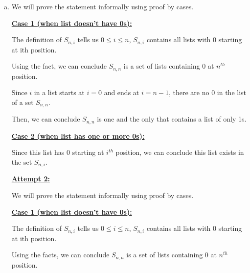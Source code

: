 \documentclass[12pt]{article}
\begin{document}
\begin{enumerate}[a.]
\begin{mdframed}
    \end{mdframed}

    \item

    We will prove the statement informally using proof by cases.

    \bigskip

    \underline{\textbf{Case 1 (when list doesn’t have 0s):}}

    \bigskip

    The definition of $S_{n,i}$ tells us $0 \leq i \leq n$, $S_{n,i}$ contains
    all lists with 0 starting at ith position.

    \bigskip

    Using the fact, we can conclude $S_{n,n}$ is a set of lists containing 0 at $n^{th}$
    position.

    \bigskip

    Since $i$ in a list starts at $i = 0$ and ends at $i = n-1$, there are no 0
    in the list of a set $S_{n,n}$.

    \bigskip

    Then, we can conclude $S_{n,n}$ is one and the only that contains a list of only 1s.

    \bigskip

    \underline{\textbf{Case 2 (when list has one or more 0s):}}

    \bigskip

    Since this list has 0 starting at $i^{th}$ position, we can conclude this list
    exists in the set $S_{n,i}$.

    \bigskip

    \begin{mdframed}
        \underline{\textbf{Attempt 2:}}

        \bigskip

        We will prove the statement informally using proof by cases.

        \bigskip

        \underline{\textbf{Case 1 (when list doesn’t have 0s):}}

        \bigskip

        The definition of $S_{n,i}$ tells us $0 \leq i \leq n$, $S_{n,i}$ contains
        all lists with 0 starting at ith position.

        \bigskip

        Using the facts, we can conclude $S_{n,n}$ is a set of lists containing 0 at $n^{th}$
        position.


\end{mdframed}
\end{enumerate}
\end{document}
